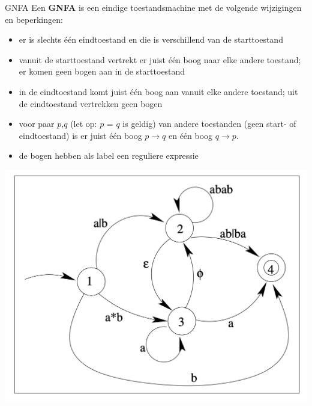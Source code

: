 \begin{theo}[GNFA]{GNFA}
    Een \textbf{GNFA} is een eindige toestandsmachine met de volgende wijzigingen en beperkingen: \\

    \begin{minipage}{.56\textwidth}
        \begin{itemize}
            \item er is slechts één eindtoestand en die is verschillend van de starttoestand
            \item vanuit de starttoestand vertrekt er juist één boog naar elke andere toestand; er komen geen bogen aan in de starttoestand
            \item in de eindtoestand komt juist één boog aan vanuit elke andere toestand; uit de eindtoestand vertrekken geen bogen
            \item voor paar \(p\),\(q\) (let op: \(p\) = \(q\) is geldig) van andere toestanden (geen start- of eindtoestand) is er juist één boog \(p \to q\) en één boog \(q \to p\).
            \item  de bogen hebben als label een reguliere expressie
        \end{itemize} 
    \end{minipage}
    \begin{minipage}{.4\textwidth}
        \includegraphics[scale = 0.35]{Images/GNFA.png}

\end{minipage}
\end{theo}
